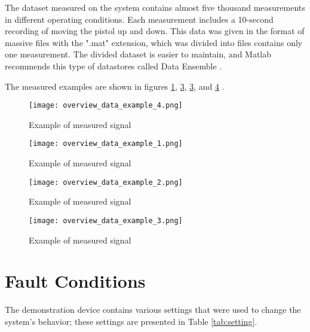 The dataset measured on the system contains almost five thousand
measurements in different operating conditions. Each measurement includes a
10-second recording of moving the pistol up and down. This data was given
in the format of massive files with the ".mat" extension, which was divided
into files contains only one measurement.  The divided dataset is easier to
maintain, and Matlab recommends this type of datastores called Data
Ensemble \cite{data_ensemble}.

The measured examples are shown in figures
\ref{fig:over_examp_1}, \ref{fig:over_examp_3}, \ref{fig:over_examp_3},
and \ref{fig:over_examp_4} .

\begin{figure}[!htb]
    \centering
    \texttt{[image: overview\_data\_example\_4.png]}
    \caption{Example of measured signal}
    \label{fig:over_examp_1}
\end{figure}


\newpage
\begin{figure}[!htb]
    \centering
    \texttt{[image: overview\_data\_example\_1.png]}
    \caption{Example of measured signal}
    \label{fig:over_examp_2}
\end{figure}

\begin{figure}[!htb]
    \centering
    \texttt{[image: overview\_data\_example\_2.png]}
    \caption{Example of measured signal}
    \label{fig:over_examp_3}
\end{figure}

\begin{figure}[!htb]
    \centering
    \texttt{[image: overview\_data\_example\_3.png]}
    \caption{Example of measured signal}
    \label{fig:over_examp_4}
\end{figure}

\section{Fault Conditions}

The demonstration device contains various settings that were used to
change the system's behavior; these settings are presented in Table
\ref{tab:setting}.

